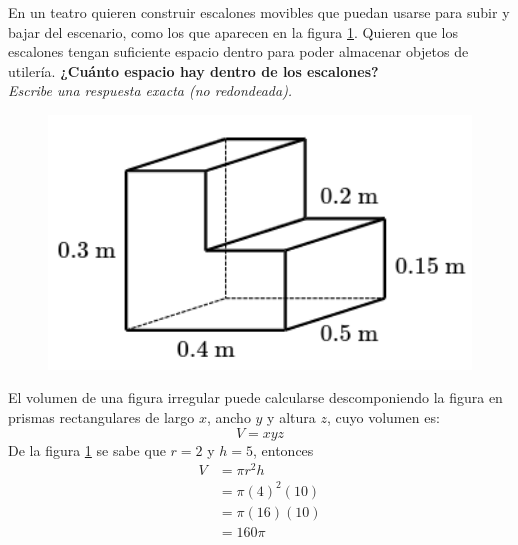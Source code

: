 \question[10] En un teatro quieren construir escalones movibles que puedan
usarse para subir y bajar del escenario,
como los que aparecen en la figura \ref{fig:vol_area_01}.
Quieren que los escalones tengan suficiente espacio dentro para poder
almacenar objetos de utilería.
\textbf{¿Cuánto espacio hay dentro de los escalones?}\\
\textit{Escribe una respuesta exacta (no redondeada).}

\begin{minipage}{0.3\linewidth}
    \begin{figure}[H]
        \begin{center}
            \includegraphics[width=1\textwidth]{../images/vol_area_01}
        \end{center}
        \caption{}
        \label{fig:vol_area_01}
    \end{figure}
\end{minipage}
\begin{minipage}{0.7\linewidth}
    \begin{solutionbox}{6cm}        El volumen de una figura irregular puede calcularse descomponiendo la figura en prismas rectangulares de largo $x$, ancho $y$ y altura $z$, cuyo volumen es:
        \begin{equation*}
            V = xyz
        \end{equation*}
        De la figura \ref{fig:vol_area_01} se sabe que $r=2$ y $h=5$, entonces
        \begin{equation*}
            \begin{split}
                V & = \pi r^2 h\\
                & = \pi (4)^2 (10)\\
                & = \pi (16) (10)\\
                & = 160\pi
            \end{split}
        \end{equation*}
    \end{solutionbox}
\end{minipage}